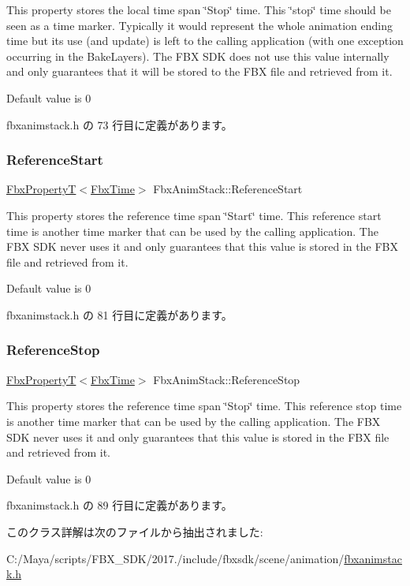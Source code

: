 This property stores the local time span \char`\"{}\+Stop\char`\"{} time. This \char`\"{}stop\char`\"{} time should be seen as a time marker. Typically it would represent the whole animation ending time but its use (and update) is left to the calling application (with one exception occurring in the Bake\+Layers). The F\+BX S\+DK does not use this value internally and only guarantees that it will be stored to the F\+BX file and retrieved from it.

Default value is 0 

 fbxanimstack.\+h の 73 行目に定義があります。

\mbox{\label{class_fbx_anim_stack_adeac4e2557e00ccd420eb9b790377e22}} 
\subsubsection{\texorpdfstring{Reference\+Start}{ReferenceStart}}
{\footnotesize\ttfamily \hyperlink{class_fbx_property_t}{Fbx\+PropertyT}$<$\hyperlink{class_fbx_time}{Fbx\+Time}$>$ Fbx\+Anim\+Stack\+::\+Reference\+Start}

This property stores the reference time span \char`\"{}\+Start\char`\"{} time. This reference start time is another time marker that can be used by the calling application. The F\+BX S\+DK never uses it and only guarantees that this value is stored in the F\+BX file and retrieved from it.

Default value is 0 

 fbxanimstack.\+h の 81 行目に定義があります。

\mbox{\label{class_fbx_anim_stack_a480a3b46ab895a740ee658e7022ec208}} 
\subsubsection{\texorpdfstring{Reference\+Stop}{ReferenceStop}}
{\footnotesize\ttfamily \hyperlink{class_fbx_property_t}{Fbx\+PropertyT}$<$\hyperlink{class_fbx_time}{Fbx\+Time}$>$ Fbx\+Anim\+Stack\+::\+Reference\+Stop}

This property stores the reference time span \char`\"{}\+Stop\char`\"{} time. This reference stop time is another time marker that can be used by the calling application. The F\+BX S\+DK never uses it and only guarantees that this value is stored in the F\+BX file and retrieved from it.

Default value is 0 

 fbxanimstack.\+h の 89 行目に定義があります。



このクラス詳解は次のファイルから抽出されました\+:\begin{DoxyCompactItemize}
\item 
C\+:/\+Maya/scripts/\+F\+B\+X\+\_\+\+S\+D\+K/2017./include/fbxsdk/scene/animation/\hyperlink{fbxanimstack_8h}{fbxanimstack.\+h}\end{DoxyCompactItemize}
